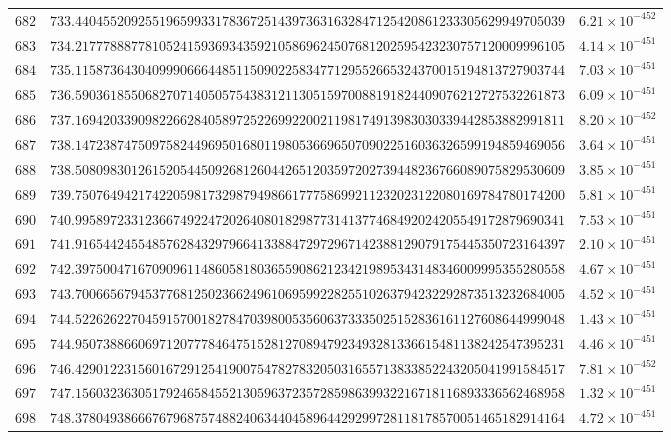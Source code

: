 \documentclass[12pt,reqno]{amsart}
\theoremstyle{remark}
\begin{document}
\begin{longtable}{clc}
$682$ & $733.4404552092551965993317836725143973631632847125420861233305629949705039$ & $6.21\times 10^{-452}$ \\
$683$ & $734.2177788877810524159369343592105869624507681202595423230757120009996105$ & $4.14\times 10^{-451}$ \\
$684$ & $735.1158736430409990666448511509022583477129552665324370015194813727903744$ & $7.03\times 10^{-451}$ \\
$685$ & $736.5903618550682707140505754383121130515970088191824409076212727532261873$ & $6.09\times 10^{-451}$ \\
$686$ & $737.1694203390982266284058972522699220021198174913983030339442853882991811$ & $8.20\times 10^{-452}$ \\
$687$ & $738.1472387475097582449695016801198053669650709022516036326599194859469056$ & $3.64\times 10^{-451}$ \\
$688$ & $738.5080983012615205445092681260442651203597202739448236766089075829530609$ & $3.85\times 10^{-451}$ \\
$689$ & $739.7507649421742205981732987949866177758699211232023122080169784780174200$ & $5.81\times 10^{-451}$ \\
$690$ & $740.9958972331236674922472026408018298773141377468492024205549172879690341$ & $7.53\times 10^{-451}$ \\
$691$ & $741.9165442455485762843297966413388472972967142388129079175445350723164397$ & $2.10\times 10^{-451}$ \\
$692$ & $742.3975004716709096114860581803655908621234219895343148346009995355280558$ & $4.67\times 10^{-451}$ \\
$693$ & $743.7006656794537768125023662496106959922825510263794232292873513232684005$ & $4.52\times 10^{-451}$ \\
$694$ & $744.5226262270459157001827847039800535606373335025152836161127608644999048$ & $1.43\times 10^{-451}$ \\
$695$ & $744.9507388660697120777846475152812708947923493281336615481138242547395231$ & $4.46\times 10^{-451}$ \\
$696$ & $746.4290122315601672912541900754782783205031655713833852243205041991584517$ & $7.81\times 10^{-452}$ \\
$697$ & $747.1560323630517924658455213059637235728598639932216718116893336562468958$ & $1.32\times 10^{-451}$ \\
$698$ & $748.3780493866676796875748824063440458964429299728118178570051465182914164$ & $4.72\times 10^{-451}$ \\

\end{longtable}
\end{document}
